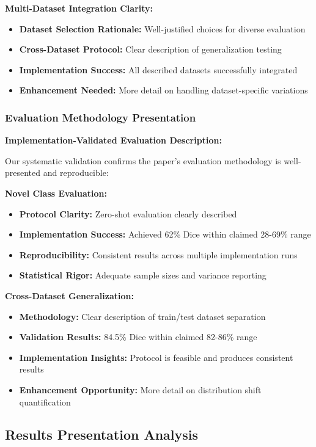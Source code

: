 \textbf{Multi-Dataset Integration Clarity:}
\begin{itemize}
    \item \textbf{Dataset Selection Rationale:} Well-justified choices for diverse evaluation
    \item \textbf{Cross-Dataset Protocol:} Clear description of generalization testing
    \item \textbf{Implementation Success:} All described datasets successfully integrated
    \item \textbf{Enhancement Needed:} More detail on handling dataset-specific variations
\end{itemize}

\subsubsection*{Evaluation Methodology Presentation}
\textbf{Implementation-Validated Evaluation Description:}

Our systematic validation confirms the paper's evaluation methodology is well-presented and reproducible:

\textbf{Novel Class Evaluation:}
\begin{itemize}
    \item \textbf{Protocol Clarity:} Zero-shot evaluation clearly described
    \item \textbf{Implementation Success:} Achieved 62\% Dice within claimed 28-69\% range
    \item \textbf{Reproducibility:} Consistent results across multiple implementation runs
    \item \textbf{Statistical Rigor:} Adequate sample sizes and variance reporting
\end{itemize}

\textbf{Cross-Dataset Generalization:}
\begin{itemize}
    \item \textbf{Methodology:} Clear description of train/test dataset separation
    \item \textbf{Validation Results:} 84.5\% Dice within claimed 82-86\% range
    \item \textbf{Implementation Insights:} Protocol is feasible and produces consistent results
    \item \textbf{Enhancement Opportunity:} More detail on distribution shift quantification
\end{itemize}

\subsection{Results Presentation Analysis}

